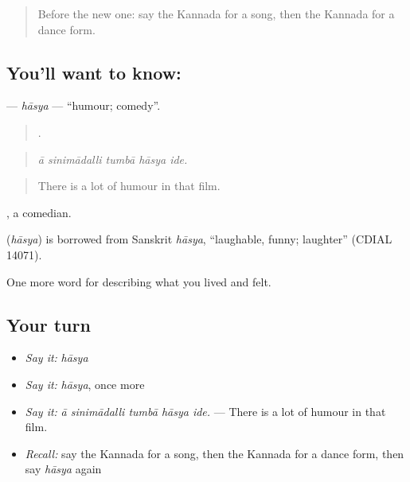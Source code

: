 \label{lesson:KA-C532-hasya}



\begin{quote}
Before the new one: say the Kannada for a song, then the Kannada for a dance form.
\end{quote}

\subsection*{You'll want to know: }
\textbf{} — \emph{hāsya} — \textquotedblleft{}humour; comedy\textquotedblright{}.

\begin{quote}
    .
\end{quote}

\begin{quote}
\emph{ā sinimādalli tumbā hāsya ide.}
\end{quote}

\begin{quote}
There is a lot of humour in that film.
\end{quote}

, a comedian.

\begin{cousinweb}
\textbf{} (\emph{hāsya}) is borrowed from Sanskrit \emph{hāsya}, \textquotedblleft{}laughable, funny; laughter\textquotedblright{} (CDIAL 14071).
\end{cousinweb}

\begin{grammarlens}[title={What you've built}]
One more word for describing what you lived and felt.
\end{grammarlens}

\subsection*{Your turn}
\begin{itemize}
\raggedright
  \item \emph{Say it:} \emph{hāsya}
  \item \emph{Say it:} \emph{hāsya}, once more
  \item \emph{Say it:} \emph{ā sinimādalli tumbā hāsya ide.} — There is a lot of humour in that film.
  \item \emph{Recall:} say the Kannada for a song, then the Kannada for a dance form, then say \emph{hāsya} again
\end{itemize}

